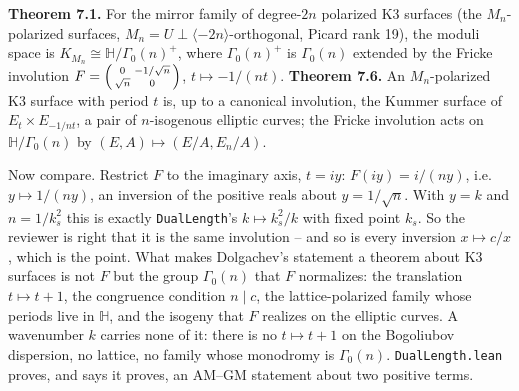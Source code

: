 \documentclass[11pt,a4paper]{article}
\newcommand{\lean}[1]{\texttt{\small #1}}
\begin{document}
\begin{keybox}
\textbf{Theorem 7.1.} For the mirror family of degree-$2n$ polarized K3 surfaces (the $M_n$-polarized
surfaces, $M_n=U\perp\langle -2n\rangle$-orthogonal, Picard rank 19), the moduli space is
$K_{M_n}\cong\mathbb{H}/\Gamma_0(n)^+$, where $\Gamma_0(n)^+$ is $\Gamma_0(n)$ extended by the Fricke
involution $F=\begin{psmallmatrix}0&-1/\sqrt n\\ \sqrt n&0\end{psmallmatrix}$, $t\mapsto -1/(nt)$.
\textbf{Theorem 7.6.} An $M_n$-polarized K3 surface with period $t$ is, up to a canonical involution,
the Kummer surface of $E_t\times E_{-1/nt}$, a pair of $n$-isogenous elliptic curves; the Fricke
involution acts on $\mathbb{H}/\Gamma_0(n)$ by $(E,A)\mapsto(E/A,E_n/A)$.
\end{keybox}

Now compare. Restrict $F$ to the imaginary axis, $t=iy$: $F(iy)=i/(ny)$, i.e.\ $y\mapsto 1/(ny)$, an
inversion of the positive reals about $y=1/\sqrt n$. With $y=k$ and $n=1/k_s^2$ this is exactly
\lean{DualLength}'s $k\mapsto k_s^2/k$ with fixed point $k_s$. So the reviewer is right that it is the
same involution -- and so is every inversion $x\mapsto c/x$, which is the point. What makes Dolgachev's
statement a theorem about K3 surfaces is not $F$ but the group $\Gamma_0(n)$ that $F$ normalizes: the
translation $t\mapsto t+1$, the congruence condition $n\mid c$, the lattice-polarized family whose
periods live in $\mathbb{H}$, and the isogeny that $F$ realizes on the elliptic curves. A wavenumber $k$
carries none of it: there is no $t\mapsto t+1$ on the Bogoliubov dispersion, no lattice, no family
whose monodromy is $\Gamma_0(n)$. \lean{DualLength.lean} proves, and says it proves, an AM--GM
statement about two positive terms.
\end{document}
